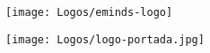 \begin{figure}[t]
	\begin{flushleft}
		\texttt{[image: Logos/eminds-logo]}
	\end{flushleft}
\end{figure}

\vspace*{40mm}

\begin{figure}[h]
	\begin{center}
		\texttt{[image: Logos/logo-portada.jpg]}
	\end{center}
\end{figure}

\vspace*{37mm}




